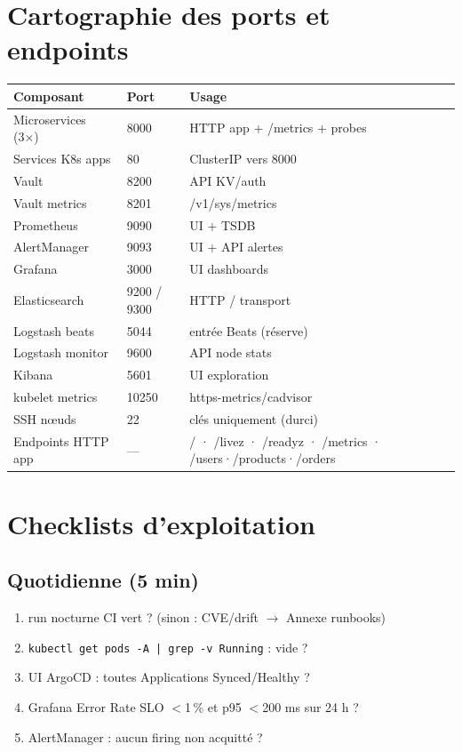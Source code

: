 \documentclass[12pt,a4paper,twoside,openright]{report}
\begin{document}
\chapter{Cartographie des ports et endpoints}

\begin{center}\label{tab:an-cartographie-des-ports-et-endpoints}\end{center}
\begin{longtable}{@{}p{4.6cm}p{2.2cm}p{7.2cm}@{}}
\toprule
\textbf{Composant} & \textbf{Port} & \textbf{Usage} \\
\midrule
\endhead
Microservices (3×) & 8000 & HTTP app + /metrics + probes \\
Services K8s apps & 80 & ClusterIP vers 8000 \\
Vault & 8200 & API KV/auth \\
Vault metrics & 8201 & /v1/sys/metrics \\
Prometheus & 9090 & UI + TSDB \\
AlertManager & 9093 & UI + API alertes \\
Grafana & 3000 & UI dashboards \\
Elasticsearch & 9200 / 9300 & HTTP / transport \\
Logstash beats & 5044 & entrée Beats (réserve) \\
Logstash monitor & 9600 & API node stats \\
Kibana & 5601 & UI exploration \\
kubelet metrics & 10250 & https-metrics/cadvisor \\
SSH nœuds & 22 & clés uniquement (durci) \\
Endpoints HTTP app & --- & / · /livez · /readyz · /metrics · /users·/products·/orders \\
\bottomrule
\end{longtable}

\chapter{Checklists d'exploitation}

\section{Quotidienne (5 min)}
\begin{enumerate}[itemsep=1pt]
  \item run nocturne CI vert ? (sinon : CVE/drift $\rightarrow$ Annexe runbooks)
  \item \texttt{kubectl get pods -A | grep -v Running} : vide ?
  \item UI ArgoCD : toutes Applications Synced/Healthy ?
  \item Grafana Error Rate SLO $<$1\,\% et p95 $<$200 ms sur 24 h ?
  \item AlertManager : aucun firing non acquitté ?
\end{enumerate}
\end{document}
